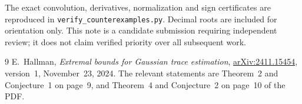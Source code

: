 \documentclass[11pt]{article}
\theoremstyle{definition}
\begin{document}
The exact convolution, derivatives, normalization and sign certificates are reproduced in \texttt{verify\_counterexamples.py}. Decimal roots are included for orientation only. This note is a candidate submission requiring independent review; it does not claim verified priority over all subsequent work.

\begin{thebibliography}{9}
E.~Hallman,
\emph{Extremal bounds for Gaussian trace estimation},
\href{https://arxiv.org/abs/2411.15454}{arXiv:2411.15454}, version~1, November~23, 2024.
The relevant statements are Theorem~2 and Conjecture~1 on page~9, and Theorem~4 and Conjecture~2 on page~10 of the PDF.
\end{thebibliography}
\end{document}
